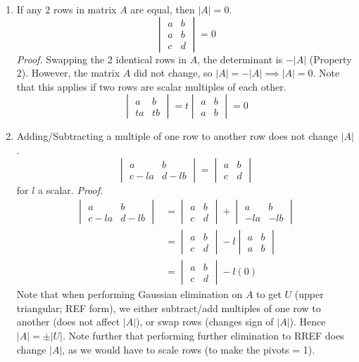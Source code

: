 \documentclass[../linear-algebra.tex]{subfiles}
\begin{document}
\begin{enumerate}
    \item If any 2 rows in matrix $A$ are equal, then $|A|=0$.
    \[\begin{vmatrix} a & b \\ a & b \\ c & d\end{vmatrix} = 0\]
    \textit{Proof.}
    Swapping the 2 identical rows in $A$, the determinant is $-|A|$ (Property 2).
    However, the matrix $A$ did not change, so $|A| = -|A| \implies |A|=0$.\newline
    Note that this applies if two rows are scalar multiples of each other.
    \[\begin{vmatrix} a & b \\ ta & tb \end{vmatrix} = t \begin{vmatrix} a & b \\ a & b \end{vmatrix} = 0\]

    \item Adding/Subtracting a multiple of one row to another row does not change $|A|$.
    \[\begin{vmatrix} a & b \\ c-la & d-lb \end{vmatrix} = \begin{vmatrix} a & b \\ c & d \end{vmatrix}\]
    for $l$ a scalar.\newline
    \textit{Proof.}
    \begin{align*}
        \begin{vmatrix} a & b \\ c-la & d-lb \end{vmatrix} &= \begin{vmatrix} a & b \\ c & d \end{vmatrix} + \begin{vmatrix} a & b \\ -la & -lb \end{vmatrix} \\
        &= \begin{vmatrix} a & b \\ c & d \end{vmatrix} - l \begin{vmatrix} a & b \\ a & b \end{vmatrix} \\
        &= \begin{vmatrix} a & b \\ c & d \end{vmatrix} - l(0)
    \end{align*}
    Note that when performing Gaussian elimination on $A$ to get $U$ (upper triangular; REF form),
    we either subtract/add multiples of one row to another (does not affect $|A|$), or swap rows (changes sign of $|A|$).
    Hence $|A| = \pm |U|$.\newline
    Note further that performing further elimination to RREF does change $|A|$,
    as we would have to scale rows (to make the pivots = 1). 


\end{enumerate}
\end{document}
